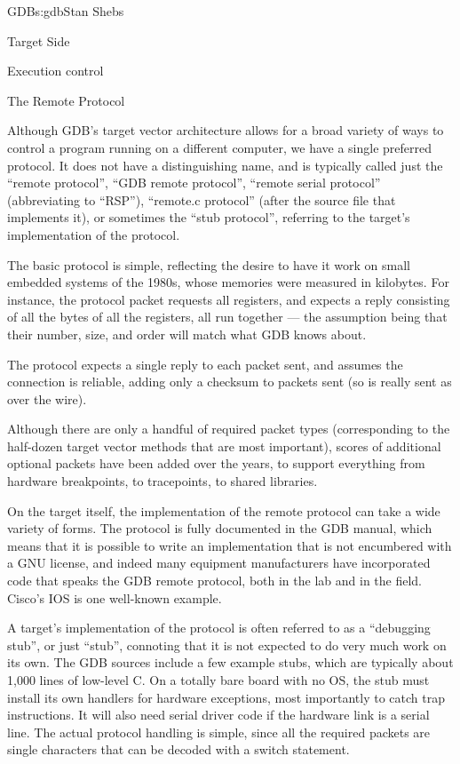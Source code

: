 \begin{aosachapter}{GDB}{s:gdb}{Stan Shebs}
\begin{aosasect1}{Target Side}
\begin{aosasect2}{Execution control}
\end{aosasect2}

\begin{aosasect2}{The Remote Protocol}

Although GDB's target vector architecture allows for a broad variety
of ways to control a program running on a different computer, we have
a single preferred protocol.  It does not have a distinguishing name,
and is typically called just the ``remote protocol'', ``GDB remote
protocol'', ``remote serial protocol'' (abbreviating to ``RSP''),
``remote.c protocol'' (after the source file that implements it), or
sometimes the ``stub protocol'', referring to the target's
implementation of the protocol.

The basic protocol is simple, reflecting the desire to have it work on
small embedded systems of the 1980s, whose memories were measured in
kilobytes.  For instance, the protocol packet  requests all
registers, and expects a reply consisting of all the bytes of all the
registers, all run together --- the assumption being that their number,
size, and order will match what GDB knows about.

The protocol expects a single reply to each packet sent, and assumes
the connection is reliable, adding only a checksum to packets sent
(so  is really sent as  over the wire).

Although there are only a handful of required packet types
(corresponding to the half-dozen target vector methods that are most
important), scores of additional optional packets have been added over
the years, to support everything from hardware breakpoints, to
tracepoints, to shared libraries.

On the target itself, the implementation of the remote protocol can
take a wide variety of forms.  The protocol is fully documented in the
GDB manual, which means that it is possible to write an implementation
that is not encumbered with a GNU license, and indeed many equipment
manufacturers have incorporated code that speaks the GDB remote
protocol, both in the lab and in the field.  Cisco's IOS is one
well-known example.

A target's implementation of the protocol is often referred to as a
``debugging stub'', or just ``stub'', connoting that it is not expected
to do very much work on its own.  The GDB sources include a few
example stubs, which are typically about 1,000 lines of low-level C.
On a totally bare board with no OS, the stub must install its own
handlers for hardware exceptions, most importantly to catch trap
instructions.  It will also need serial driver code if the hardware
link is a serial line.  The actual protocol handling is simple, since
all the required packets are single characters that can be decoded
with a switch statement.


\end{aosasect2}
\end{aosasect1}
\end{aosachapter}
